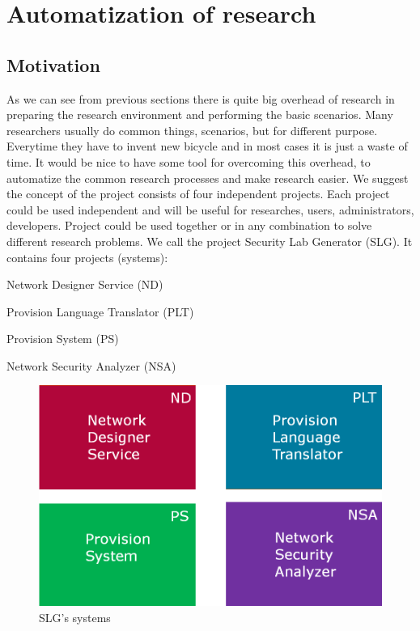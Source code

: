 \documentclass[twoside]{article}
\newcommand{\myNDS}{Network Designer Service}
\newcommand{\myPLT}{Provision Language Translator}
\newcommand{\myPS}{Provision System}
\newcommand{\myNSA}{Network Security Analyzer}
\begin{document}
\section{Automatization of research}

\subsection{Motivation}
As we can see from previous sections there is quite big overhead of research in preparing the research environment and performing the basic scenarios. Many researchers usually do common things, scenarios, but for different purpose. Everytime they have to invent new bicycle and in most cases it is just a waste of time. It would be nice to have some tool for overcoming this overhead, to automatize the common research processes and make research easier. We suggest the concept of the project consists of four independent projects. Each project could be used independent and will be useful for researches, users, administrators, developers. Project could be used together or in any combination to solve different research problems. We call the project Security Lab Generator (SLG). It contains four projects (systems): 
\begin{compactitem}
\item \myNDS{ } (ND)
\item \myPLT{ } (PLT)
\item \myPS{ } (PS)
\item \myNSA{ } (NSA)
\end{compactitem}

\begin{figure}[ht!]
\centering
\includegraphics[width=120mm]{slg_structure.png}
\caption{SLG's systems}
\label{overflow}
\end{figure}
 
\end{document}

